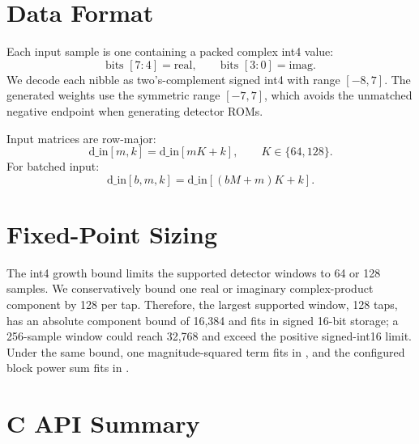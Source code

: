 \documentclass[10pt,letterpaper]{article}
\newcommand{\code}[1]{\texttt{\detokenize{#1}}}
\begin{document}
\section{Data Format}

Each input sample is one \code{int8_t} containing a packed complex int4 value:
\begin{equation}
  \text{bits }[7:4]=\mathrm{real},\qquad \text{bits }[3:0]=\mathrm{imag}.
\end{equation}
We decode each nibble as two's-complement signed int4 with range \([-8,7]\). The generated weights use the symmetric range \([-7,7]\), which avoids the unmatched negative endpoint when generating detector ROMs.

Input matrices are row-major:
\begin{equation}
  \mathrm{d\_in}[m,k]=\mathrm{d\_in}[mK+k],\qquad K\in\{64,128\}.
\end{equation}
For batched input:
\begin{equation}
  \mathrm{d\_in}[b,m,k]=\mathrm{d\_in}[(bM+m)K+k].
\end{equation}

\section{Fixed-Point Sizing}

The int4 growth bound limits the supported detector windows to 64 or 128
samples. We conservatively bound one real or imaginary complex-product
component by 128 per tap. Therefore, the largest supported window, 128 taps,
has an absolute component bound of 16,384 and fits in signed 16-bit storage; a
256-sample window could reach 32,768 and exceed the positive signed-int16
limit. Under the same bound, one magnitude-squared term fits in \code{uint32},
and the configured block power sum fits in \code{uint64}.

\section{C API Summary}
\end{document}
